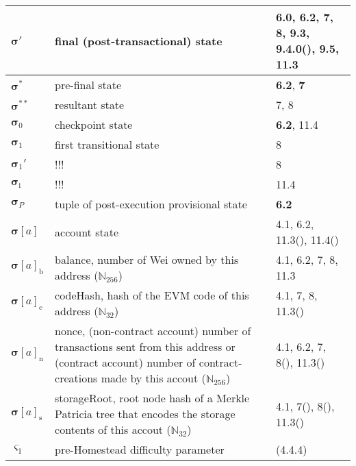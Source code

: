 \documentclass[9pt,oneside]{amsart}
\newcommand{\reff}[1]{{\footnotesize #1}}
\begin{document}
\begin{longtabu}{X[1.2lm] X[3] X}
$\boldsymbol{\sigma}'$ &
final (post-transactional) state &
\reff{6.0, 6.2, 7, 8, 9.3, 9.4.0(), 9.5, 11.3} \\\hline

$\boldsymbol{\sigma}^*$ &
pre-final state &
\reff{\textbf{6.2}, \textbf{7}} \\\hline

$\boldsymbol{\sigma}^{**}$ &
resultant state &
\reff{7, 8} \\\hline

$\boldsymbol{\sigma}_0$ &
checkpoint state &
\reff{\textbf{6.2}, 11.4} \\\hline

$\boldsymbol{\sigma}_1$ &
first transitional state &
\reff{8} \\\hline

$\boldsymbol{\sigma}_1'$ &
!!! &
\reff{8} \\\hline

$\boldsymbol{\sigma}_{\mathrm{i}}$ &
!!! &
\reff{11.4} \\\hline

$\boldsymbol{\sigma}_{P}$ &
tuple of post-execution provisional state &
\reff{\textbf{6.2}} \\\hline

$\boldsymbol{\sigma}[a]$ &
account state &
\reff{4.1, 6.2, 11.3(), 11.4()} \\\hline

$\boldsymbol{\sigma}[a]_{\mathrm{b}}$ &
balance, number of Wei owned by this address ($\mathbb{N}_{256}$) &
\reff{4.1, 6.2, 7, 8, 11.3} \\\hline

$\boldsymbol{\sigma}[a]_{\mathrm{c}}$ &
codeHash, hash of the EVM code of this address ($\mathbb{N}_{32}$) &
\reff{4.1, 7, 8, 11.3()} \\\hline

$\boldsymbol{\sigma}[a]_{\mathrm{n}}$ &
nonce, (non-contract account) number of transactions sent from this address or (contract account) number of contract-creations made by this accout ($\mathbb{N}_{256}$) &
\reff{4.1, 6.2, 7, 8(), 11.3()} \\\hline

$\boldsymbol{\sigma}[a]_{\mathrm{s}}$ &
storageRoot, root node hash of a Merkle Patricia tree that encodes the storage contents of this accout ($\mathbb{N}_{32}$) &
\reff{4.1, 7(), 8(), 11.3()} \\\hline

$\varsigma_1$ &
pre-Homestead difficulty parameter &
\reff{(4.4.4)} \\\hline


\end{longtabu}
\end{document}
